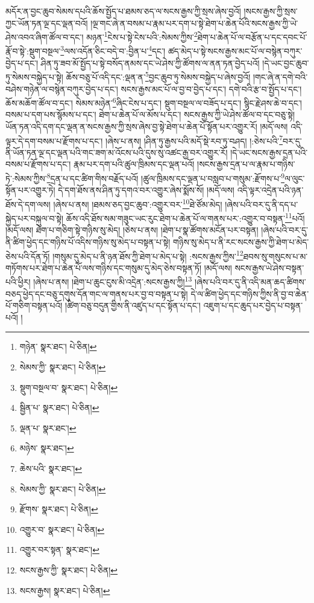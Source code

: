 མདོར་ན་བྱང་ཆུབ་སེམས་དཔའི་ཆོས་སྤྱོད་པ་ཐམས་ཅད་ལ་སངས་རྒྱས་ཀྱི་སྲས་ཞེས་བྱའོ། །སངས་རྒྱས་ཀྱི་སྲས་ཀྱང་ཡོན་ཏན་ལྔ་དང་ལྡན་བའོ། །ལྔ་གང་ཞེ་ན་བསམ་པ་རྣམ་པར་དག་པ་སྟེ་ཐེག་པ་ཆེན་པོའི་སངས་རྒྱས་ཀྱི་ཡེ་ཤེས་འབའ་ཞིག་ཚོལ་བ་དང་། མཉན་\footnote{གཉེན་  སྣར་ཐང་།  པེ་ཅིན། }ངེས་པ་སྟེ་ངེས་པའི་:སེམས་ཀྱིས་\footnote{སེམས་ཀྱི་  སྣར་ཐང་།  པེ་ཅིན། }ཐེག་པ་ཆེན་པོ་ལ་བརྩོན་པ་དང་དབང་པོ་རྣོ་བ་སྟེ་:སྡུག་བསྔལ་\footnote{སྡུག་བསྔལ་བ་  སྣར་ཐང་།  པེ་ཅིན། }ལས་འདོན་ཅིང་བདེ་བ་:བྱིན་པ་\footnote{སྦྱིན་པ་  སྣར་ཐང་།  པེ་ཅིན། }དང་། ཚད་མེད་པ་སྟེ་སངས་རྒྱས་མང་པོ་ལ་བསྙེན་བཀུར་བྱེད་པ་དང་། ཤིན་ཏུ་ཟབ་མོ་སྤྱོད་པ་སྟེ་བསོད་ནམས་དང་ཡེ་ཤེས་ཀྱི་ཚོགས་ལ་ནན་ཏན་བྱེད་པའོ། །དེ་ཡང་བྱང་ཆུབ་ཏུ་སེམས་བསྐྱེད་པ་སྟེ། ཆོས་བཅུ་པོ་འདི་དང་:ལྡན་ན་\footnote{ལྡན་པ་  སྣར་ཐང་། }བྱང་ཆུབ་ཏུ་སེམས་བསྐྱེད་པ་ཞེས་བྱའོ། །གང་ཞེ་ན་དགེ་བའི་བཤེས་གཉེན་ལ་བསྙེན་བཀུར་བྱེད་པ་དང་། སངས་རྒྱས་མང་པོ་ལ་བྱ་བ་བྱེད་པ་དང་། དགེ་བའི་རྩ་བ་སྤྱོད་པ་དང་། ཆོས་མཆོག་ཚོལ་བ་དང་། སེམས་མཉེན་\footnote{མཉེས་  སྣར་ཐང་། }ཞིང་ངེས་པ་དང་། སྡུག་བསྔལ་ལ་བཟོད་པ་དང་། སྙིང་རྗེ་ཤས་ཆེ་བ་དང་། བསམ་པ་དག་པས་སྙོམས་པ་དང་། ཐེག་པ་ཆེན་པོ་ལ་མོས་པ་དང་། སངས་རྒྱས་ཀྱི་ཡེ་ཤེས་ཚོལ་བ་དང་བཅུ་སྟེ། ཡོན་ཏན་འདི་དག་དང་ལྡན་ན་སངས་རྒྱས་ཀྱི་སྲས་ཞེས་བྱ་སྟེ་ཐེག་པ་ཆེན་པོ་སྟོན་པར་འགྱུར་རོ། །མདོ་ལས། འདི་ལྟར་དེ་དག་བསམ་པ་རྫོགས་པ་དང་། །ཞེས་པ་ནས། །ཤིན་ཏུ་རྒྱས་པའི་མདོ་སྡེ་རབ་ཏུ་བཤད། །:ཅེས་པའི་\footnote{ཆེས་པའི་  སྣར་ཐང་། }བར་དུ་ནི་ཡོན་ཏན་ལྔ་དང་ལྡན་པའི་གང་ཟག་མ་འོངས་པའི་དུས་སུ་འཚང་རྒྱ་བར་འགྱུར་རོ། །དེ་ཡང་སངས་རྒྱས་དྲན་པའི་བསམ་པ་རྫོགས་པ་དང་། རྣམ་པར་དག་པའི་ཚུལ་ཁྲིམས་དང་ལྡན་པའོ། །སངས་རྒྱས་དྲན་པ་ལ་རྣམ་པ་གཉིས་ཏེ་:སེམས་ཀྱིས་\footnote{སེམས་ཀྱི་  སྣར་ཐང་།  པེ་ཅིན། }དྲན་པ་དང་ཚིག་གིས་བརྗོད་པའོ། །ཚུལ་ཁྲིམས་དང་ལྡན་པ་བསླབ་པ་གསུམ་:རྫོགས་པ་\footnote{རྫོགས་  སྣར་ཐང་།  པེ་ཅིན། }ལ་ལུང་སྟོན་པར་འགྱུར་ཏེ། དེ་དག་ཐོས་ནས་ཤིན་ཏུ་དགའ་བར་འགྱུར་ཞེས་སྨོས་སོ། །མདོ་ལས། འདི་ལྟར་འདྲེན་པའི་ཉན་ཐོས་དེ་དག་ལས། །ཞེས་པ་ནས། །ཐམས་ཅད་བྱང་ཆུབ་:འགྱུར་བར་\footnote{འགྱུར་བ་  སྣར་ཐང་།  པེ་ཅིན། }ཐེ་ཙོམ་མེད། །ཞེས་པའི་བར་དུ་ནི་དད་པ་སྐྱེད་པར་བསྐུལ་བ་སྟེ། ཆོས་འདི་ཐོས་སམ་གཟུང་ཡང་རུང་ཐེག་པ་ཆེན་པོ་ལ་གནས་པར་:འགྱུར་བ་བསྟན་\footnote{འགྱུར་བར་སྟན་  སྣར་ཐང་། }པའོ། །མདོ་ལས། ཐེག་པ་གཅིག་སྟེ་གཉིས་སུ་མེད། །ཅེས་པ་ནས། །ཐེག་པ་སྣ་ཚོགས་མངོན་པར་བསྟན། །ཞེས་པའི་བར་དུ་ནི་ཚིག་ཕྱེད་དང་གཉིས་པོ་འདིས་གཉིས་སུ་མེད་པ་བསྟན་པ་སྟེ། གཉིས་སུ་མེད་པ་ནི་རང་སངས་རྒྱས་ཀྱི་ཐེག་པ་མེད་ཅེས་པའི་དོན་ཏོ། །གསུམ་དུ་མེད་པ་ནི་ཉན་ཐོས་ཀྱི་ཐེག་པ་མེད་པ་སྟེ། :སངས་རྒྱས་ཀྱིས་\footnote{སངས་རྒྱས་ཀྱི་  སྣར་ཐང་།  པེ་ཅིན། }ཐབས་སུ་གསུངས་པ་མ་གཏོགས་པར་ཐེག་པ་ཆེན་པོ་ལས་གཉིས་དང་གསུམ་དུ་མེད་ཅེས་བསྟན་ཏོ། །མདོ་ལས། སངས་རྒྱས་ཡེ་ཤེས་བསྟན་པའི་ཕྱིར། །ཞེས་པ་ནས། །ཐེག་པ་ཆུང་ངུས་མི་འདྲེན་:སངས་རྒྱས་ཀྱི།\footnote{སངས་རྒྱས།  སྣར་ཐང་།  པེ་ཅིན། } །ཞེས་པའི་བར་དུ་ནི་འདི་མན་ཆད་ཚིགས་བཅད་ཕྱེད་དང་བཅུ་དགུས་དོན་གང་ལ་གནས་པར་བྱ་བ་བསྟན་པ་སྟེ། དེ་ལ་ཚིག་ཕྱེད་དང་གཉིས་ཀྱིས་ནི་བྱ་བ་ཆེན་པོ་གཅིག་བསྟན་པའོ། །ཚིག་བཅུ་བདུན་གྱིས་ནི་འཛུད་པ་དང་སྟོན་པ་དང་། འཇུག་པ་དང་ཆུད་པར་བྱེད་པ་བསྟན་པའོ། །
